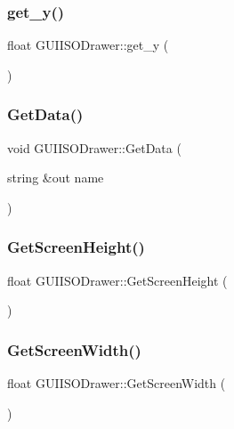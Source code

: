 \subsubsection{\texorpdfstring{get\+\_\+y()}{get\_y()}}
{\footnotesize\ttfamily float G\+U\+I\+I\+S\+O\+Drawer\+::get\+\_\+y (\begin{DoxyParamCaption}{ }\end{DoxyParamCaption})}

\hypertarget{class_g_u_i_i_s_o_drawer_ac1c1efb0e8f95eef67b16f933693a319}{}\label{class_g_u_i_i_s_o_drawer_ac1c1efb0e8f95eef67b16f933693a319} 
\subsubsection{\texorpdfstring{Get\+Data()}{GetData()}}
{\footnotesize\ttfamily void G\+U\+I\+I\+S\+O\+Drawer\+::\+Get\+Data (\begin{DoxyParamCaption}\item[{string \&out}]{name }\end{DoxyParamCaption})}

\hypertarget{class_g_u_i_i_s_o_drawer_adcdb5a708bfdf9b195ed675bb5b6ad51}{}\label{class_g_u_i_i_s_o_drawer_adcdb5a708bfdf9b195ed675bb5b6ad51} 
\subsubsection{\texorpdfstring{Get\+Screen\+Height()}{GetScreenHeight()}}
{\footnotesize\ttfamily float G\+U\+I\+I\+S\+O\+Drawer\+::\+Get\+Screen\+Height (\begin{DoxyParamCaption}{ }\end{DoxyParamCaption})}

\hypertarget{class_g_u_i_i_s_o_drawer_a410165e47a97a400fd59acbae335a635}{}\label{class_g_u_i_i_s_o_drawer_a410165e47a97a400fd59acbae335a635} 
\subsubsection{\texorpdfstring{Get\+Screen\+Width()}{GetScreenWidth()}}
{\footnotesize\ttfamily float G\+U\+I\+I\+S\+O\+Drawer\+::\+Get\+Screen\+Width (\begin{DoxyParamCaption}{ }\end{DoxyParamCaption})}

